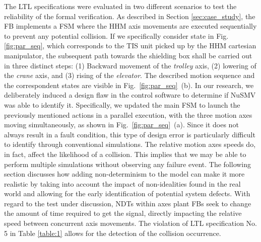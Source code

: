 \begin{bibunit}
The LTL specifications were evaluated in two different scenarios to test the reliability of the formal verification. 
As described in Section \ref{sec:case_study}, the  FB implements a FSM where the HHM axis movements are executed sequentially to prevent any potential collision. 
If we specifically consider state  in Fig. \ref{fig:par_seq}, which corresponds to the TIS unit picked up by the HHM cartesian manipulator, the subsequent path towards the shielding box shall be carried out in three distinct steps: (1) Backward movement of the \textit{trolley} axis, (2) lowering of the \textit{crane} axis, and (3) rising of the \textit{elevator}. The described motion sequence and the correspondent states are visible in \mbox{Fig. \ref{fig:par_seq} (b)}.
In our research, we deliberately induced a design flaw in the control software to determine if NuSMV was able to identify it. 
Specifically, we updated the main FSM to launch the previously mentioned actions in a parallel execution, with the three motion axes moving simultaneously, as shown in \mbox{Fig. \ref{fig:par_seq} (a)}. 
Since it does not always result in a fault condition, this type of design error is particularly difficult to identify through conventional simulations. 
The relative motion axes speeds do, in fact, affect the likelihood of a collision. This implies that we may be able to perform multiple simulations without observing any failure event. The following section discusses how adding non-determinism to the model can make it more realistic by taking into account the impact of non-idealities found in the real world and allowing for the early identification of potential system defects.
With regard to the test under discussion, NDTs within axes plant FBs seek to change the amount of time required to get the  signal, directly impacting the relative speed between concurrent axis movements.
The violation of LTL specification No. 5 in Table \ref{table:1} allows for the detection of the collision occurrence. 


\end{bibunit}
